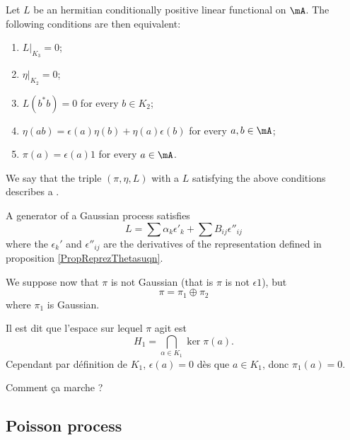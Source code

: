 \begin{proposition}     \label{PropProcessusGaussien}
    Let $L$ be an hermitian conditionally positive linear functional on $\mA$. The following conditions are then equivalent:
    \begin{enumerate}
        \item
            $L|_{K_3}=0$;
        \item
            $\eta|_{K_2}=0$;
        \item
            $L(b^*b)=0$ for every $b\in K_2$;
        \item
            $\eta(ab)=\epsilon(a)\eta(b)+\eta(a)\epsilon(b)$ for every $a,b\in\mA$;
        \item
            $\pi(a)=\epsilon(a)1$ for every $a\in\mA$.
    \end{enumerate}
\end{proposition}
We say that the triple $(\pi,\eta,L)$ with a $L$ satisfying the above conditions describes a .

\begin{proposition}
    A generator of a Gaussian process satisfies
    \begin{equation}
        L=\sum\alpha_k\epsilon'_k+\sum B_{ij}\epsilon''_{ij}
    \end{equation}
    where the $\epsilon_k'$ and $\epsilon''_{ij}$ are the derivatives of the representation defined in proposition \ref{PropReprezThetasuqn}.
\end{proposition}

We suppose now that $\pi$ is not Gaussian (that is $\pi$ is not $\epsilon 1$), but
\begin{equation}
    \pi=\pi_1\oplus\pi_2
\end{equation}
where $\pi_1$ is Gaussian.

\begin{probleme}
    Il est dit que l'espace sur lequel $\pi$ agit est 
    \begin{equation}
        H_1=\bigcap_{\alpha\in K_1}\ker\pi(a).
    \end{equation}
    Cependant par définition de $K_1$, $\epsilon(a)=0$ dès que $a\in K_1$, donc $\pi_1(a)=0$.

    Comment ça marche ?
\end{probleme}

\subsection{Poisson process}

